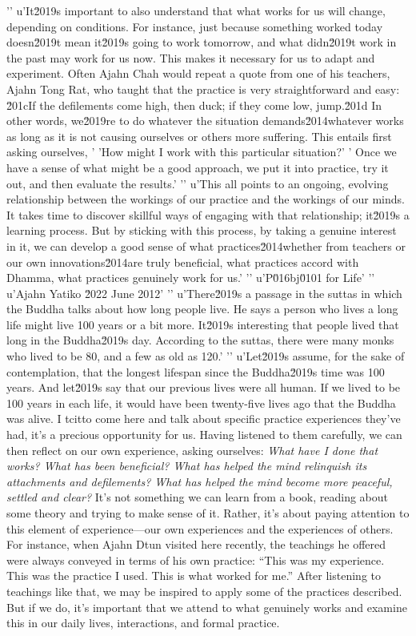 '\n'
u'It\u2019s important to also understand that what works for us will change, depending on conditions. For instance, just because something worked today doesn\u2019t mean it\u2019s going to work tomorrow, and what didn\u2019t work in the past may work for us now. This makes it necessary for us to adapt and experiment. Often Ajahn Chah would repeat a quote from one of his teachers, Ajahn Tong Rat, who taught that the practice is very straightforward and easy: \u201cIf the defilements come high, then duck; if they come low, jump.\u201d In other words, we\u2019re to do whatever the situation demands\u2014whatever works as long as it is not causing ourselves or others more suffering. This entails first asking ourselves, '
'How might I work with this particular situation?'
' Once we have a sense of what might be a good approach, we put it into practice, try it out, and then evaluate the results.'
'\n'
u'This all points to an ongoing, evolving relationship between the workings of our practice and the workings of our minds. It takes time to discover skillful ways of engaging with that relationship; it\u2019s a learning process. But by sticking with this process, by taking a genuine interest in it, we can develop a good sense of what practices\u2014whether from teachers or our own innovations\u2014are truly beneficial, what practices accord with Dhamma, what practices genuinely work for us.'
'\n'
u'P\u016bj\u0101 for Life'
'\n'
u'Ajahn Yatiko \u2022 June 2012'
'\n'
u'There\u2019s a passage in the suttas in which the Buddha talks about how long people live. He says a person who lives a long life might live 100 years or a bit more. It\u2019s interesting that people lived that long in the Buddha\u2019s day. According to the suttas, there were many monks who lived to be 80, and a few as old as 120.'
'\n'
u'Let\u2019s assume, for the sake of contemplation, that the longest lifespan since the Buddha\u2019s time was 100 years. And let\u2019s say that our previous lives were all human. If we lived to be 100 years in each life, it would have been twenty-five lives ago that the Buddha was alive. I tcitto come here and talk about specific practice experiences they've 
had, it's a precious opportunity for us. Having listened to them 
carefully, we can then reflect on our own experience, asking ourselves: 
\emph{What have I done that works? What has been beneficial? What has 
helped the mind relinquish its attachments and defilements? What has 
helped the mind become more peaceful, settled and clear?} It's not 
something we can learn from a book, reading about some theory and 
trying to make sense of it. Rather, it's about paying attention to this 
element of experience---our own experiences and the experiences of 
others. For instance, when Ajahn Dtun visited here recently, the 
teachings he offered were always conveyed in terms of his own practice: 
``This was my experience. This was the practice I used. This is what 
worked for me.'' After listening to teachings like that, we may be 
inspired to apply some of the practices described. But if we do, it's 
important that we attend to what genuinely works and examine this in 
our daily lives, interactions, and formal practice.

